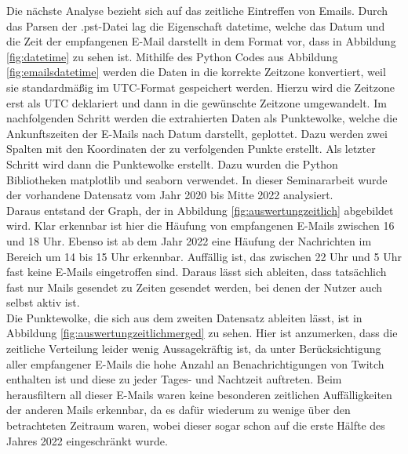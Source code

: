 Die nächste Analyse bezieht sich auf das zeitliche Eintreffen von Emails. Durch das Parsen der .pst-Datei lag die Eigenschaft \glqq{}datetime\grqq, welche das Datum und die Zeit der empfangenen E-Mail darstellt in dem Format vor, dass in Abbildung \ref{fig:datetime} zu sehen ist. Mithilfe des Python Codes aus Abbildung \ref{fig:emailsdatetime} werden die Daten in die korrekte Zeitzone konvertiert, weil sie standardmäßig im UTC-Format gespeichert werden. Hierzu wird die Zeitzone erst als UTC deklariert und dann in die gewünschte Zeitzone umgewandelt. Im nachfolgenden Schritt werden die extrahierten Daten als Punktewolke, welche die Ankunftszeiten der E-Mails nach Datum darstellt, geplottet. Dazu werden zwei Spalten mit den Koordinaten der zu verfolgenden Punkte erstellt. Als letzter Schritt wird dann die Punktewolke erstellt. Dazu wurden die Python Bibliotheken \glqq{}matplotlib\grqq{} und \glqq{}seaborn\grqq{} verwendet. In dieser Seminararbeit wurde der vorhandene Datensatz vom Jahr 2020 bis Mitte 2022 analysiert. \\
Daraus entstand der Graph, der in Abbildung \ref{fig:auswertungzeitlich} abgebildet wird. Klar erkennbar ist hier die Häufung von empfangenen E-Mails zwischen 16 und 18 Uhr. Ebenso ist ab dem Jahr 2022 eine Häufung der Nachrichten im Bereich um 14 bis 15 Uhr erkennbar. Auffällig ist, das zwischen 22 Uhr und 5 Uhr fast keine E-Mails eingetroffen sind. Daraus lässt sich ableiten, dass tatsächlich fast nur Mails gesendet zu Zeiten gesendet werden, bei denen der Nutzer auch selbst aktiv ist. \\


Die Punktewolke, die sich aus dem zweiten Datensatz ableiten lässt, ist in Abbildung \ref{fig:auswertungzeitlichmerged} zu sehen. Hier ist anzumerken, dass die zeitliche Verteilung leider wenig Aussagekräftig ist, da unter Berücksichtigung aller empfangener E-Mails die hohe Anzahl an Benachrichtigungen von \glqq{}Twitch\grqq{} enthalten ist und diese zu jeder Tages- und Nachtzeit auftreten. Beim herausfiltern all dieser E-Mails waren keine besonderen zeitlichen Auffälligkeiten der anderen Mails erkennbar, da es dafür wiederum zu wenige über den betrachteten Zeitraum waren, wobei dieser sogar schon auf die erste Hälfte des Jahres 2022 eingeschränkt wurde. \\


